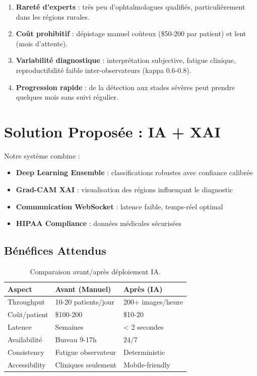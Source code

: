 \documentclass[12pt,a4paper,oneside]{report}
\begin{document}
\begin{enumerate}
    \item \textbf{Rareté d'experts} : très peu d'ophtalmologues qualifiés, 
          particulièrement dans les régions rurales.
    \item \textbf{Coût prohibitif} : dépistage manuel coûteux 
          (\$50-200 par patient) et lent (mois d'attente).
    \item \textbf{Variabilité diagnostique} : interprétation subjective, 
          fatigue clinique, reproductibilité faible inter-observateurs 
          (kappa 0.6-0.8).
    \item \textbf{Progression rapide} : de la détection aux stades 
          sévères peut prendre quelques mois sans suivi régulier.
\end{enumerate}

\section{Solution Proposée : IA + XAI}

Notre système combine :

\begin{itemize}
    \item \textbf{Deep Learning Ensemble} : classifications robustes 
          avec confiance calibrée
    \item \textbf{Grad-CAM XAI} : visualisation des régions influençant 
          le diagnostic
    \item \textbf{Communication WebSocket} : latence faible, 
          temps-réel optimal
    \item \textbf{HIPAA Compliance} : données médicales sécurisées
\end{itemize}

\subsection{Bénéfices Attendus}

\begin{table}[H]
\centering
\begin{tabular}{|l|l|l|}
\hline
\textbf{Aspect} & \textbf{Avant (Manuel)} & \textbf{Après (IA)} \\
\hline
Throughput & 10-20 patients/jour & 200+ images/heure \\
Coût/patient & \$100-200 & \$10-20 \\
Latence & Semaines & < 2 secondes \\
Availabilité & Bureau 9-17h & 24/7 \\
Consistency & Fatigue observateur & Deterministic \\
Accessibility & Cliniques seulement & Mobile-friendly \\
\hline
\end{tabular}
\caption{Comparaison avant/après déploiement IA.}
\label{tab:before_after}
\end{table}
\end{document}
